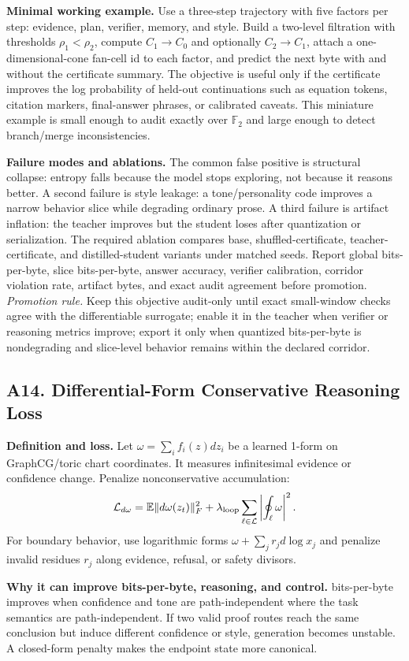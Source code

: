 \documentclass[10pt]{article}
\newcommand{\FF}{\mathbb{F}}
\newcommand{\loss}{\mathcal{L}}
\numberwithin{equation}{section}
\begin{document}
\noindent\textbf{Minimal working example.} Use a three-step trajectory with five factors per step: evidence, plan, verifier, memory, and style. Build a two-level filtration with thresholds $\rho_1<\rho_2$, compute $C_1\to C_0$ and optionally $C_2\to C_1$, attach a one-dimensional-cone fan-cell id to each factor, and predict the next byte with and without the certificate summary. The objective is useful only if the certificate improves the log probability of held-out continuations such as equation tokens, citation markers, final-answer phrases, or calibrated caveats. This miniature example is small enough to audit exactly over $\FF_2$ and large enough to detect branch/merge inconsistencies.

\noindent\textbf{Failure modes and ablations.} The common false positive is structural collapse: entropy falls because the model stops exploring, not because it reasons better. A second failure is style leakage: a tone/personality code improves a narrow behavior slice while degrading ordinary prose. A third failure is artifact inflation: the teacher improves but the student loses after quantization or serialization. The required ablation compares base, shuffled-certificate, teacher-certificate, and distilled-student variants under matched seeds. Report global bits-per-byte, slice bits-per-byte, answer accuracy, verifier calibration, corridor violation rate, artifact bytes, and exact audit agreement before promotion.
\vfill
\noindent\emph{Promotion rule.} Keep this objective audit-only until exact small-window checks agree with the differentiable surrogate; enable it in the teacher when verifier or reasoning metrics improve; export it only when quantized bits-per-byte is nondegrading and slice-level behavior remains within the declared corridor.
\clearpage
\subsection{A14. Differential-Form Conservative Reasoning Loss}
\noindent\textbf{Definition and loss.} Let $\omega=\sum_i f_i(z)dz_i$ be a learned 1-form on GraphCG/toric chart coordinates. It measures infinitesimal evidence or confidence change. Penalize nonconservative accumulation:
\[
\loss_{d\omega}=\mathbb E\|d\omega(z_t)\|_F^2+\lambda_{\rm loop}\sum_{\ell\in\mathcal L}\left|\oint_\ell \omega\right|^2.
\]
For boundary behavior, use logarithmic forms $\omega+\sum_j r_j d\log x_j$ and penalize invalid residues $r_j$ along evidence, refusal, or safety divisors.

\noindent\textbf{Why it can improve bits-per-byte, reasoning, and control.} bits-per-byte improves when confidence and tone are path-independent where the task semantics are path-independent. If two valid proof routes reach the same conclusion but induce different confidence or style, generation becomes unstable. A closed-form penalty makes the endpoint state more canonical.
\end{document}
